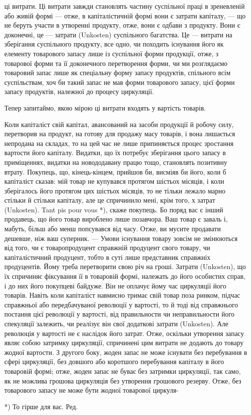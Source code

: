 ці витрати. Ці витрати завжди становлять частину суспільної праці в зреневленій
або живій формі — отже, в капіталістичній формі вони є затрати
капіталу, — що не беруть участи в утворенні продукту, отже, вони є одбави
з продукту. Вони є доконечні, це — затрати (Unkosten) суспільного
багатства. Це — витрати на зберігання суспільного продукту, все одно,
чи походить існування його як елементу товарового запасу лише
із суспільної форми продукції, отже, з товарової форми та її доконечного
перетворення форми, чи ми розглядаємо товаровий запас лише як спеціальну
форму запасу продуктів, спільного всім суспільствам, хоч би
такий запас не мав форми товарового запасу, цієї форми запасу продуктів,
належної до процесу циркуляції.

Тепер запитаймо, якою мірою ці витрати входять у вартість товарів.

Коли капіталіст свій капітал, авансований на засоби продукції й робочу
силу, перетворив на продукт, на готову для продажу масу товарів, і вона
лишається непродана на складах, то на цей час не лише припиняється
процес зростання вартости його капіталу. Видатки, що їх потребує зберігання
цього запасу в приміщеннях, видатки на новододавану працю тощо, становлять
позитивну втрату. Покупець, що, кінець-кінцем, прийшов би, висміяв
би його, коли б капіталіст сказав: мій товар не купувався протягом шістьох
місяців, і коли зберігалось його протягом цих шістьох місяців, то не
тільки лежало марно стільки й стільки капіталу, але це спричинило мені,
крім того, х затрат (Unkosten). Tant pis pour vous *), скаже покупець. Бо
поряд вас є інший продавець, що його товар вироблено лише позавчора.
Ваш товар є заваль і, мабуть, більш або менш попсувався від часу. Отже,
ви мусите продавати дешевше, ніж ваш суперник. — Умови існування
товару зовсім не змінюються від того, чи є товаропродуцент справжній
продуцент свого товару, чи капіталістичний продуцент, тобто в суті
лише представник справжніх продуцентів. Йому треба перетворити свою
річ на гроші. Затрати (Unkosten), що їх спричиняє фіксування її
в товаровій формі, належать до його особистих справ, і до них його
покупцеві байдуже. Він не оплачує йому час циркуляції його товарів.
Навіть коли капіталіст навмисно тримає свій товар поза ринком, підчас
справжньої або передбачуваної революції у вартості, то й тоді від
справжнього постання цієї революції у вартості, від правильности чи
неправильности його спекуляції залежить, чи реалізує він свої додаткові
затрати (Unkosten). Але революція у вартості не є наслідок його затрат.
Отже, оскільки утворення запасу являє собою затримку циркуляції, спричинені
цим витрати не додають до товару жодної вартости. З другого
боку, жоден запас не може існувати без перебування в сфері циркуляції,
без довшого або коротшого перебування капіталу в його товаровій
формі; отже, жоден запас не буває без затримки циркуляції, так само,
як не можлива грошова циркуляція без утворення грошового резерву.
Отже, без товарового запасу не може бути жодної товарової циркуля-

*) То гірше для вас. Ред.
